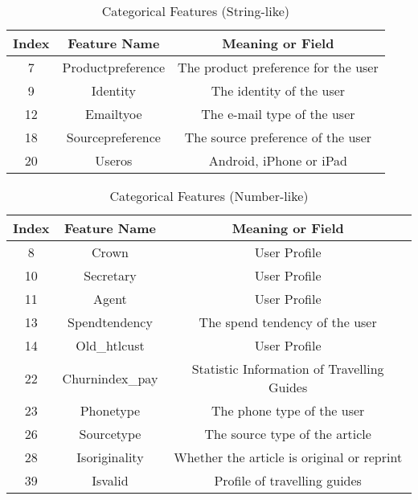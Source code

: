\documentclass{article}
\begin{document}
    \begin{table}[!h]
		\centering
		\small{
		    \caption{Categorical Features (String-like)}
			\begin{tabular}{ccc}
				\toprule
				\textbf{Index}  & \textbf{Feature Name}  &\textbf{Meaning or Field}\\ 
				\midrule
				7          & Productpreference & The product preference for the user\\ 
				9          & Identity          & The identity of the user\\
 				12         & Emailtyoe         & The e-mail type of the user\\ 
				18         & Sourcepreference  & The source preference of the user\\
				20         & Useros            & Android, iPhone or iPad\\
			\bottomrule 
			\end{tabular}
			
			\label{ta:cfs}
		}
	\end{table}

    \begin{table}[!h]
		\centering
		\small{
		    \caption{Categorical Features (Number-like)}
			\begin{tabular}{ccc}
				\toprule
				\textbf{Index}  & \textbf{Feature Name}  &\textbf{Meaning or Field}\\ 
				\midrule
				8          & Crown                & User Profile \\ 
				10         & Secretary            & User Profile \\ 
				11         & Agent                & User Profile \\
				13         & Spendtendency        & The spend tendency of the user \\
				14         & Old\_htlcust         & User Profile \\
				22         & Churnindex\_pay      & Statistic Information of Travelling Guides \\
				23         & Phonetype            & The phone type of the user \\
				26         & Sourcetype           & The source type of the article \\
				28         & Isoriginality        & Whether the article is original or reprint\\
				39         & Isvalid              & Profile of travelling guides \\        
			\bottomrule 
			\end{tabular}
			
			\label{ta:cfn}
		}
	\end{table}
\end{document}
